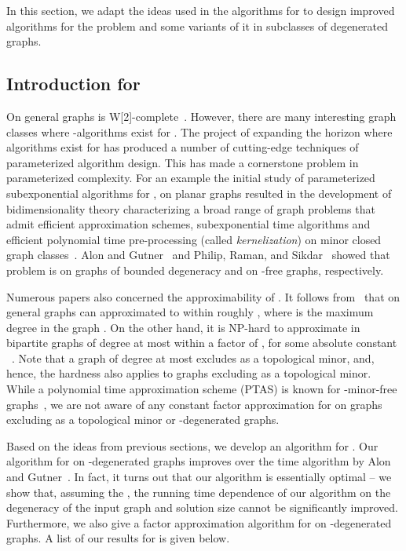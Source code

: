 In this section, we adapt the ideas used in the algorithms for {\dst} to design improved algorithms for the {\ds} problem and some variants of it in subclasses of degenerated graphs.

\subsection{Introduction for \ds{}}

On general graphs {\ds} is W[2]-com\-ple\-te~\cite{DF99}. However, there are many interesting graph classes where {\FPT}-algorithms exist for {\ds}. The project of expanding the horizon where \FPT{} algorithms exist for \ds{} has produced a number of cutting-edge techniques of parameterized algorithm design. This has made {\ds} a cornerstone problem in parameterized complexity. For an example the initial study of parameterized subexponential algorithms for {\ds}, on planar graphs \cite{AlberBFKN02,FominT06} resulted in the development of bidimensionality theory characterizing a broad range of graph problems  that admit efficient approximation schemes, subexponential time \FPT{} algorithms and efficient polynomial time pre-processing (called {\em kernelization}) on minor closed graph classes~\cite{DemaineFHT05sub,DemaineHaj05}. Alon and Gutner~\cite{AlonG09} and Philip, Raman, and Sikdar~\cite{PhilipRS09} showed that \ds{} problem is {\FPT} on graphs of bounded degeneracy and on -free graphs,  
respectively.

Numerous papers also concerned the approximability of \ds{}. It follows from~\cite{DuhF97} that \ds{} on general graphs can approximated to within roughly , where  is the maximum degree in the graph . On the other hand, it is NP-hard to approximate \ds{} in bipartite graphs of degree at most  within a factor of , for some absolute constant ~\cite{ChlebikC08}. Note that a graph of degree at most  excludes  as a topological minor, and, hence, the hardness also applies to graphs excluding  as a topological minor. While a polynomial time approximation scheme (PTAS) is known for -minor-free graphs~\cite{Grohe03}, we are not aware of any constant factor approximation for \ds{} on graphs excluding  as a topological minor or -degenerated graphs.



Based on the ideas from previous sections, we develop an algorithm for \ds{}.
Our algorithm for {\ds} on -degenerated graphs improves over the  time algorithm by Alon and Gutner~\cite{AlonG09}. In fact, it turns out that our algorithm is essentially optimal -- we show that, assuming the \ETH{}, the running time dependence of our algorithm on the degeneracy of the input graph and solution size  cannot be significantly improved. Furthermore, we also give a factor  approximation algorithm for {\ds} on -degenerated graphs. A list of our results for {\ds} is given below.

